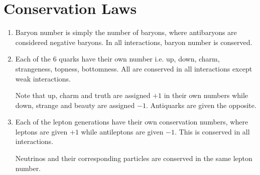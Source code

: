 \section{Conservation Laws}
\begin{enumerate}
    \item Baryon number is simply the number of baryons, where antibaryons are considered negative baryons. In all interactions, baryon number is conserved.
    \item Each of the 6 quarks have their own number i.e. up, down, charm, strangeness, topness, bottomness. All are conserved in all interactions except weak interactions.
    
    Note that up, charm and truth are assigned \(+1\) in their own numbers while down, strange and beauty are assigned \(-1\). Antiquarks are given the opposite.
    \item Each of the lepton generations have their own conservation numbers, where leptons are given \(+1\) while antileptons are given \(-1\). This is conserved in all interactions.
    
    Neutrinos and their corresponding particles are conserved in the same lepton number.
\end{enumerate}